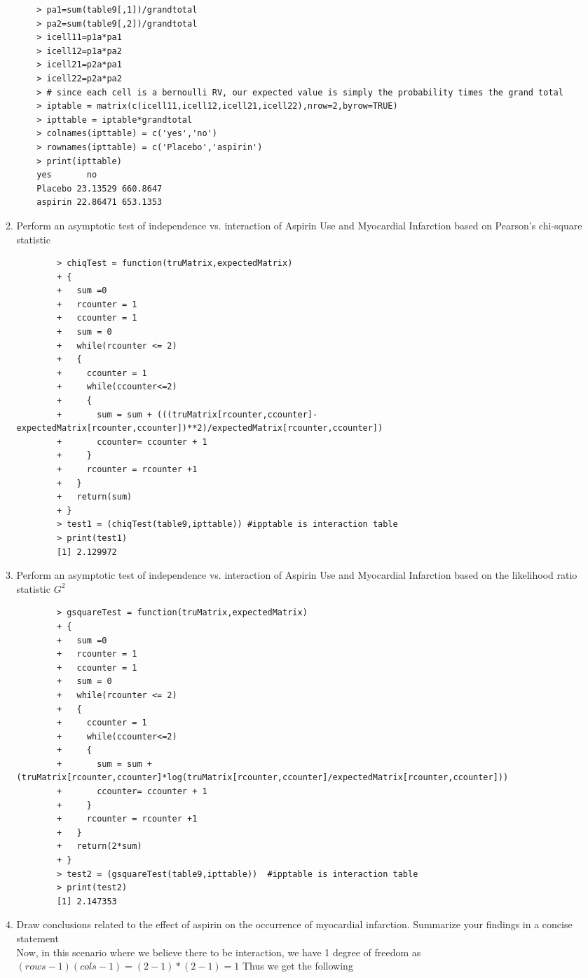 \documentclass[11pt]{article}
\begin{document}
\begin{enumerate}
\begin{enumerate}
\begin{verbatim}
	> pa1=sum(table9[,1])/grandtotal
	> pa2=sum(table9[,2])/grandtotal
	> icell11=p1a*pa1
	> icell12=p1a*pa2
	> icell21=p2a*pa1
	> icell22=p2a*pa2
	> # since each cell is a bernoulli RV, our expected value is simply the probability times the grand total
	> iptable = matrix(c(icell11,icell12,icell21,icell22),nrow=2,byrow=TRUE)
	> ipttable = iptable*grandtotal
	> colnames(ipttable) = c('yes','no')
	> rownames(ipttable) = c('Placebo','aspirin')
	> print(ipttable)
	yes       no
	Placebo 23.13529 660.8647
	aspirin 22.86471 653.1353
	\end{verbatim}
	\item Perform an asymptotic test of independence vs. interaction of Aspirin Use and Myocardial Infarction based on Pearson’s chi-square statistic
	\begin{verbatim}
		> chiqTest = function(truMatrix,expectedMatrix)
		+ {
		+   sum =0
		+   rcounter = 1
		+   ccounter = 1
		+   sum = 0
		+   while(rcounter <= 2)
		+   {
		+     ccounter = 1
		+     while(ccounter<=2)
		+     {
		+       sum = sum + (((truMatrix[rcounter,ccounter]-expectedMatrix[rcounter,ccounter])**2)/expectedMatrix[rcounter,ccounter])
		+       ccounter= ccounter + 1
		+     }
		+     rcounter = rcounter +1
		+   }
		+   return(sum)
		+ }
		> test1 = (chiqTest(table9,ipttable)) #ipptable is interaction table
		> print(test1)
		[1] 2.129972
	\end{verbatim}
	\item Perform an asymptotic test of independence vs. interaction of Aspirin Use and Myocardial Infarction based on the likelihood ratio statistic $G^2$
	\begin{verbatim}
		> gsquareTest = function(truMatrix,expectedMatrix)
		+ {
		+   sum =0
		+   rcounter = 1
		+   ccounter = 1
		+   sum = 0
		+   while(rcounter <= 2)
		+   {
		+     ccounter = 1
		+     while(ccounter<=2)
		+     {
		+       sum = sum + (truMatrix[rcounter,ccounter]*log(truMatrix[rcounter,ccounter]/expectedMatrix[rcounter,ccounter]))
		+       ccounter= ccounter + 1
		+     }
		+     rcounter = rcounter +1
		+   }
		+   return(2*sum)
		+ }
		> test2 = (gsquareTest(table9,ipttable))  #ipptable is interaction table
		> print(test2)
		[1] 2.147353
	\end{verbatim}
	\item Draw conclusions related to the effect of aspirin on the occurrence of myocardial infarction. Summarize your findings in a concise statement\\
		Now, in this scenario where we believe there to be interaction, we have 1 degree of freedom as $(rows-1)(cols-1) = (2-1)*(2-1)=1$ Thus we get the following

\end{enumerate}
\end{enumerate}
\end{document}
